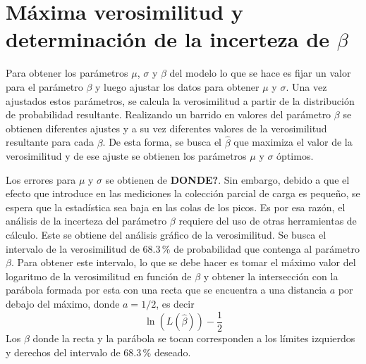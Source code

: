 \section{Máxima verosimilitud y determinación de la incerteza de \texorpdfstring{$\beta$}{beta}\label{sec:MaximaVerosimilitud}}
\noindent Para obtener los parámetros $\mu$, $\sigma$ y $\beta$ del modelo lo que se hace es fijar un valor para el parámetro $\beta$ y luego ajustar los datos para obtener $\mu$ y $\sigma$. Una vez ajustados estos parámetros, se calcula la verosimilitud a partir de la distribución de probabilidad resultante. Realizando un barrido en valores del parámetro $\beta$ se obtienen diferentes ajustes y a su vez diferentes valores de la verosimilitud resultante para cada $\beta$. De esta forma, se busca el $\hat{\beta}$ que maximiza el valor de la verosimilitud y de ese ajuste se obtienen los parámetros $\mu$ y $\sigma$ óptimos. 

Los errores para $\mu$ y $\sigma$ se obtienen de \textbf{DONDE?}. Sin embargo, debido a que el efecto que introduce en las mediciones la colección parcial de carga es pequeño, se espera que la estadística sea baja en las colas de los picos. Es por esa razón, el análisis de la incerteza del parámetro $\beta$ requiere del uso de otras herramientas de cálculo. Este se obtiene del análisis gráfico de la verosimilitud. Se busca el intervalo de la verosimilitud de $68.3\,\%$ de probabilidad que contenga al parámetro $\beta$. Para obtener este intervalo, lo que se debe hacer es tomar el máximo valor del logaritmo de la verosimilitud en función de $\beta$ y obtener la intersección con la parábola formada por esta con una recta que se encuentra a una distancia $a$ por debajo del máximo, donde $a = 1/2$, es decir
\begin{equation*}
    \ln{
        \left(
            L(\hat{\beta})
        \right)
        } - \frac{1}{2}
\end{equation*}
Los $\beta$ donde la recta y la parábola se tocan corresponden a los límites izquierdos y derechos del intervalo de $68.3\,\%$ deseado\cite{Frodesen}.

